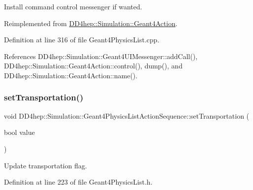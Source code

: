 Install command control messenger if wanted. 



Reimplemented from \hyperlink{class_d_d4hep_1_1_simulation_1_1_geant4_action_aaaa0718b7d4f52e4c31e982b91c0eeda}{D\+D4hep\+::\+Simulation\+::\+Geant4\+Action}.



Definition at line 316 of file Geant4\+Physics\+List.\+cpp.



References D\+D4hep\+::\+Simulation\+::\+Geant4\+U\+I\+Messenger\+::add\+Call(), D\+D4hep\+::\+Simulation\+::\+Geant4\+Action\+::control(), dump(), and D\+D4hep\+::\+Simulation\+::\+Geant4\+Action\+::name().

\hypertarget{class_d_d4hep_1_1_simulation_1_1_geant4_physics_list_action_sequence_a0572d68ab6ffc8a826a84a4ae56f4327}{}\label{class_d_d4hep_1_1_simulation_1_1_geant4_physics_list_action_sequence_a0572d68ab6ffc8a826a84a4ae56f4327} 
\subsubsection{\texorpdfstring{set\+Transportation()}{setTransportation()}}
{\footnotesize\ttfamily void D\+D4hep\+::\+Simulation\+::\+Geant4\+Physics\+List\+Action\+Sequence\+::set\+Transportation (\begin{DoxyParamCaption}\item[{bool}]{value }\end{DoxyParamCaption})\hspace{0.3cm}{\ttfamily [inline]}}



Update transportation flag. 



Definition at line 223 of file Geant4\+Physics\+List.\+h.

\hypertarget{class_d_d4hep_1_1_simulation_1_1_geant4_physics_list_action_sequence_a93499b47b96e1183341c406390dca646}{}\label{class_d_d4hep_1_1_simulation_1_1_geant4_physics_list_action_sequence_a93499b47b96e1183341c406390dca646} 
